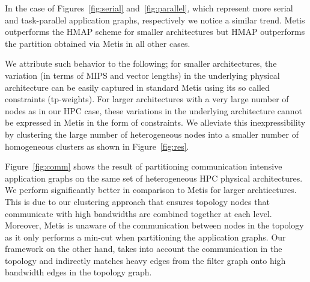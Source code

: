 
In the case of Figures~\ref{fig:serial} and~\ref{fig:parallel}, which
represent more serial and task-parallel application graphs, respectively
we notice a similar trend. Metis outperforms the HMAP scheme for smaller
architectures but HMAP outperforms the partition obtained via Metis in
all other cases.


We attribute such behavior to the following; for smaller architectures,
the variation (in terms of MIPS and vector lengths) in the underlying
physical architecture can be easily captured in standard Metis using its
so called constraints (tp-weights). For larger architectures with a very
large number of nodes as in our HPC case, these variations in the
underlying architecture cannot be expressed in Metis in the form of
constraints. We alleviate this inexpressibility by clustering the large
number of heterogeneous nodes into a smaller number of homogeneous
clusters as shown in Figure~\ref{fig:res}.


Figure~\ref{fig:comm} shows the result of partitioning communication
intensive application graphs on the same set of heterogeneous HPC
physical architectures. We perform significantly better in comparison to
Metis for larger archtiectures. This is due to our clustering approach
that ensures topology nodes that communicate with high bandwidths are
combined together at each level. Moreover, Metis is unaware of the
communication between nodes in the topology as it only performs a
min-cut when partitioning the application graphs. Our framework on the
other hand, takes into account the communication in the topology and
indirectly matches heavy edges from the filter graph onto high bandwidth
edges in the topology graph.

